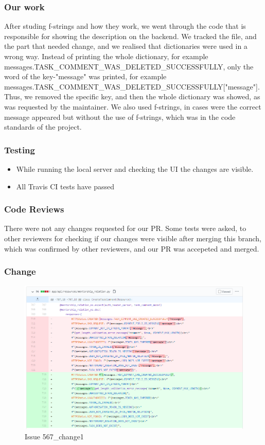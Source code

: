 \documentclass{article}
\begin{document}
\subsubsection{Our work}
After studing f-strings and how they work, we went through the code that is responsible for showing the description on the backend. We tracked the file, and the part that needed change, and we realised that dictionaries were used in a wrong way. Instead of printing the whole dictionary, for example messages.TASK\_COMMENT\_WAS\_DELETED\_SUCCESSFULLY, only the word of the key-"message" was printed, for example messages.TASK\_COMMENT\_WAS\_DELETED\_SUCCESSFULLY["message"]. Thus, we removed the specific key, and then the whole dictionary was showed, as was requested by the maintainer. We also used f-strings, in cases were the correct message appeared but without the use of f-strings, which was in the code standards of the project.
\subsubsection{Testing}
\begin{itemize}
\item While running the local server and checking the UI the changes are visible.
\item All Travis CI tests have passed
\end{itemize}
\subsubsection{Code Reviews}
There were not any changes requested for our PR. Some tests were asked, to other reviewers for checking if our changes were visible after merging this branch, which was confirmed by other reviewers, and our PR was accepeted and merged.
\subsubsection{Change}
\begin{figure}[tph!]
\centerline{\includegraphics[totalheight=14cm, width=16cm]{567Changes_1.png}}
    \caption{Issue 567\_change1}
    \label{fig:verticalcell}
\end{figure}
\end{document}
